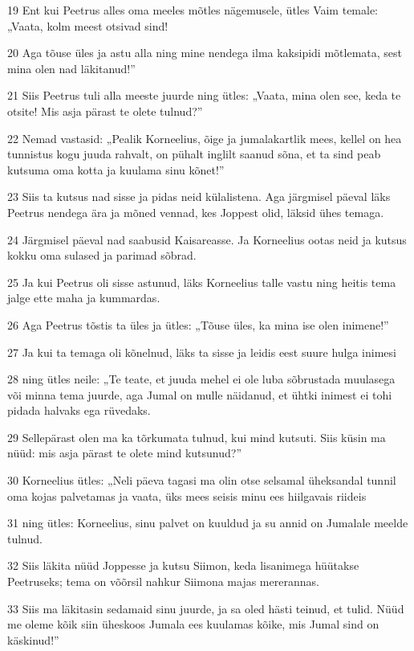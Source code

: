 \par 19 Ent kui Peetrus alles oma meeles mõtles nägemusele, ütles Vaim temale: „Vaata, kolm meest otsivad sind!
\par 20 Aga tõuse üles ja astu alla ning mine nendega ilma kaksipidi mõtlemata, sest mina olen nad läkitanud!”
\par 21 Siis Peetrus tuli alla meeste juurde ning ütles: „Vaata, mina olen see, keda te otsite! Mis asja pärast te olete tulnud?”
\par 22 Nemad vastasid: „Pealik Korneelius, õige ja jumalakartlik mees, kellel on hea tunnistus kogu juuda rahvalt, on pühalt inglilt saanud sõna, et ta sind peab kutsuma oma kotta ja kuulama sinu kõnet!”
\par 23 Siis ta kutsus nad sisse ja pidas neid külalistena. Aga järgmisel päeval läks Peetrus nendega ära ja mõned vennad, kes Joppest olid, läksid ühes temaga.
\par 24 Järgmisel päeval nad saabusid Kaisareasse. Ja Korneelius ootas neid ja kutsus kokku oma sulased ja parimad sõbrad.
\par 25 Ja kui Peetrus oli sisse astunud, läks Korneelius talle vastu ning heitis tema jalge ette maha ja kummardas.
\par 26 Aga Peetrus tõstis ta üles ja ütles: „Tõuse üles, ka mina ise olen inimene!”
\par 27 Ja kui ta temaga oli kõnelnud, läks ta sisse ja leidis eest suure hulga inimesi
\par 28 ning ütles neile: „Te teate, et juuda mehel ei ole luba sõbrustada muulasega või minna tema juurde, aga Jumal on mulle näidanud, et ühtki inimest ei tohi pidada halvaks ega rüvedaks.
\par 29 Sellepärast olen ma ka tõrkumata tulnud, kui mind kutsuti. Siis küsin ma nüüd: mis asja pärast te olete mind kutsunud?”
\par 30 Korneelius ütles: „Neli päeva tagasi ma olin otse selsamal üheksandal tunnil oma kojas palvetamas ja vaata, üks mees seisis minu ees hiilgavais riideis
\par 31 ning ütles: Korneelius, sinu palvet on kuuldud ja su annid on Jumalale meelde tulnud.
\par 32 Siis läkita nüüd Joppesse ja kutsu Siimon, keda lisanimega hüütakse Peetruseks; tema on võõrsil nahkur Siimona majas mererannas.
\par 33 Siis ma läkitasin sedamaid sinu juurde, ja sa oled hästi teinud, et tulid. Nüüd me oleme kõik siin üheskoos Jumala ees kuulamas kõike, mis Jumal sind on käskinud!”

